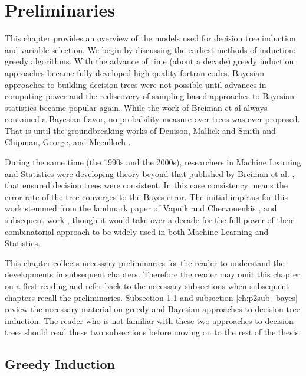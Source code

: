 \section{Preliminaries}
\label{ch:preliminaries}
This chapter provides an overview of the models used for decision tree induction and variable selection. We begin by discussing the earliest methods of induction: greedy algorithms. With the advance of time (about a decade) greedy induction approaches became fully developed high quality fortran codes. Bayesian approaches to building decision trees were not possible until advances in computing power and the rediscovery of sampling based approaches to Bayesian statistics became popular again. While the work of Breiman et al \cite{breiman1984classification} always contained a Bayesian flavor, no probability measure over trees was ever proposed. That is until the groundbreaking works of Denison, Mallick and Smith \cite{denison1998bayesian} and Chipman, George, and Mcculloch \cite{chipman1998bayesian}.

 During the same time (the 1990s and the 2000s), researchers in Machine Learning and Statistics were developing theory beyond that published by Breiman et al. \cite{breiman1984classification}, that ensured decision trees were consistent. In this case consistency means the error rate of the tree converges to the Bayes error. The initial impetus for this work stemmed from the landmark paper of Vapnik and Chervonenkis \cite{vapnik1971uniform}, and subsequent work \cite{vapnik2000nature}, though it would take over a decade for the full power of their combinatorial approach to be widely used in both Machine Learning and Statistics. 

This chapter collects necessary preliminaries for the reader to understand the developments in subsequent chapters. Therefore the reader may omit this chapter on a first reading and refer back to the necessary subsections when subsequent chapters recall the preliminaries. Subsection \ref{ch:p1sub_greedy_ind} and subsection \ref{ch:p2sub_bayes} review the necessary material on greedy and Bayesian approaches to decision tree induction. The reader who is not familiar with these two approaches to decision trees should read these two subsections before moving on to the rest of the thesis.  

\subsection{Greedy Induction}
\label{ch:p1sub_greedy_ind}

